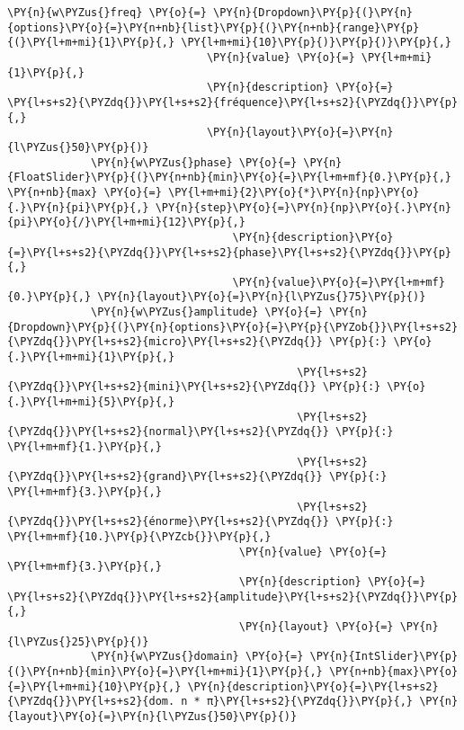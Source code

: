 \begin{Verbatim}[commandchars=\\\{\}]
             \PY{n}{w\PYZus{}freq} \PY{o}{=} \PY{n}{Dropdown}\PY{p}{(}\PY{n}{options}\PY{o}{=}\PY{n+nb}{list}\PY{p}{(}\PY{n+nb}{range}\PY{p}{(}\PY{l+m+mi}{1}\PY{p}{,} \PY{l+m+mi}{10}\PY{p}{)}\PY{p}{)}\PY{p}{,}
                               \PY{n}{value} \PY{o}{=} \PY{l+m+mi}{1}\PY{p}{,}
                               \PY{n}{description} \PY{o}{=} \PY{l+s+s2}{\PYZdq{}}\PY{l+s+s2}{fréquence}\PY{l+s+s2}{\PYZdq{}}\PY{p}{,}
                               \PY{n}{layout}\PY{o}{=}\PY{n}{l\PYZus{}50}\PY{p}{)}
             \PY{n}{w\PYZus{}phase} \PY{o}{=} \PY{n}{FloatSlider}\PY{p}{(}\PY{n+nb}{min}\PY{o}{=}\PY{l+m+mf}{0.}\PY{p}{,} \PY{n+nb}{max} \PY{o}{=} \PY{l+m+mi}{2}\PY{o}{*}\PY{n}{np}\PY{o}{.}\PY{n}{pi}\PY{p}{,} \PY{n}{step}\PY{o}{=}\PY{n}{np}\PY{o}{.}\PY{n}{pi}\PY{o}{/}\PY{l+m+mi}{12}\PY{p}{,}
                                   \PY{n}{description}\PY{o}{=}\PY{l+s+s2}{\PYZdq{}}\PY{l+s+s2}{phase}\PY{l+s+s2}{\PYZdq{}}\PY{p}{,}
                                   \PY{n}{value}\PY{o}{=}\PY{l+m+mf}{0.}\PY{p}{,} \PY{n}{layout}\PY{o}{=}\PY{n}{l\PYZus{}75}\PY{p}{)}
             \PY{n}{w\PYZus{}amplitude} \PY{o}{=} \PY{n}{Dropdown}\PY{p}{(}\PY{n}{options}\PY{o}{=}\PY{p}{\PYZob{}}\PY{l+s+s2}{\PYZdq{}}\PY{l+s+s2}{micro}\PY{l+s+s2}{\PYZdq{}} \PY{p}{:} \PY{o}{.}\PY{l+m+mi}{1}\PY{p}{,}
                                             \PY{l+s+s2}{\PYZdq{}}\PY{l+s+s2}{mini}\PY{l+s+s2}{\PYZdq{}} \PY{p}{:} \PY{o}{.}\PY{l+m+mi}{5}\PY{p}{,}
                                             \PY{l+s+s2}{\PYZdq{}}\PY{l+s+s2}{normal}\PY{l+s+s2}{\PYZdq{}} \PY{p}{:} \PY{l+m+mf}{1.}\PY{p}{,}
                                             \PY{l+s+s2}{\PYZdq{}}\PY{l+s+s2}{grand}\PY{l+s+s2}{\PYZdq{}} \PY{p}{:} \PY{l+m+mf}{3.}\PY{p}{,}
                                             \PY{l+s+s2}{\PYZdq{}}\PY{l+s+s2}{énorme}\PY{l+s+s2}{\PYZdq{}} \PY{p}{:} \PY{l+m+mf}{10.}\PY{p}{\PYZcb{}}\PY{p}{,}
                                    \PY{n}{value} \PY{o}{=} \PY{l+m+mf}{3.}\PY{p}{,}
                                    \PY{n}{description} \PY{o}{=} \PY{l+s+s2}{\PYZdq{}}\PY{l+s+s2}{amplitude}\PY{l+s+s2}{\PYZdq{}}\PY{p}{,}
                                    \PY{n}{layout} \PY{o}{=} \PY{n}{l\PYZus{}25}\PY{p}{)}
             \PY{n}{w\PYZus{}domain} \PY{o}{=} \PY{n}{IntSlider}\PY{p}{(}\PY{n+nb}{min}\PY{o}{=}\PY{l+m+mi}{1}\PY{p}{,} \PY{n+nb}{max}\PY{o}{=}\PY{l+m+mi}{10}\PY{p}{,} \PY{n}{description}\PY{o}{=}\PY{l+s+s2}{\PYZdq{}}\PY{l+s+s2}{dom. n * π}\PY{l+s+s2}{\PYZdq{}}\PY{p}{,} \PY{n}{layout}\PY{o}{=}\PY{n}{l\PYZus{}50}\PY{p}{)}
         

\end{Verbatim}
